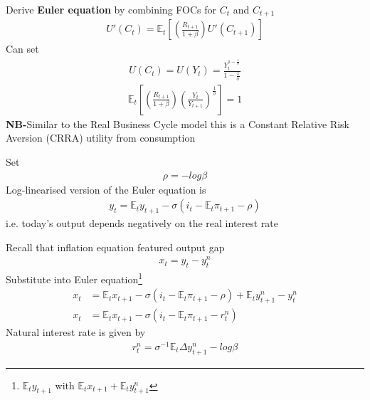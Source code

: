 \documentclass{beamer}
\begin{document}
\begin{frame}
  Derive \textbf{Euler equation} by combining FOCs for $C_t$ and $C_{t+1}$ 
\begin{align}  
  U'(C_t) = \mathbb{E}_t \left[ \left(\frac{R_{t+1}}{1+\beta} \right) U'(C_{t+1})\right] 
  \end{align}
  Can set
  \begin{align}
    U(C_t)=U(Y_t)=\frac{Y_t^{1-\frac{1}{\sigma}}}{1-\frac{1}{\sigma}}
  \end{align}
  \begin{align}
  \mathbb{E}_t \left[ \left( \frac{R_{t+1}}{1+\beta} \right) \left( \frac{Y_t}{Y_{t+1}} \right)^{\frac{1}{\sigma}} \right]=1 
 \end{align}
 \textbf{NB-}Similar to the Real Business Cycle model this is a Constant Relative Risk Aversion (CRRA) utility from consumption
\end{frame}

\begin{frame}
  Set 
  \begin{align}
    \rho=-log\beta
  \end{align}
Log-linearised version of the Euler equation is 
\begin{align}  
y_t=\mathbb{E}_ty_{t+1} - \sigma(i_t - \mathbb{E}_t\pi_{t+1} - \rho) 
\end{align}
i.e. today's output depends negatively on the real interest rate
\end{frame}


\begin{frame}
  Recall that inflation equation featured output gap  
  \begin{align}
    x_t=y_t-y_t^n  
  \end{align}
  Substitute into Euler equation\footnote{$\mathbb{E}_ty_{t+1}$ with $\mathbb{E}_tx_{t+1}+\mathbb{E}_ty^n_{t+1}$}
\begin{align}
  x_t &= \mathbb{E}_t x_{t+1} - \sigma (i_t - \mathbb{E}_t \pi_{t+1} - \rho) + \mathbb{E}_t y_{t+1}^n - y_t^n\\
  x_t &= \mathbb{E}_t x_{t+1} - \sigma (i_t - \mathbb{E}_t \pi_{t+1} - r_t^n)
\end{align}
\medskip
Natural interest rate is given by
\begin{align}
  r_t^n=\sigma^{-1}\mathbb{E}_t\Delta y_{t+1}^n - log \beta  
\end{align}
\end{frame}
\end{document}
